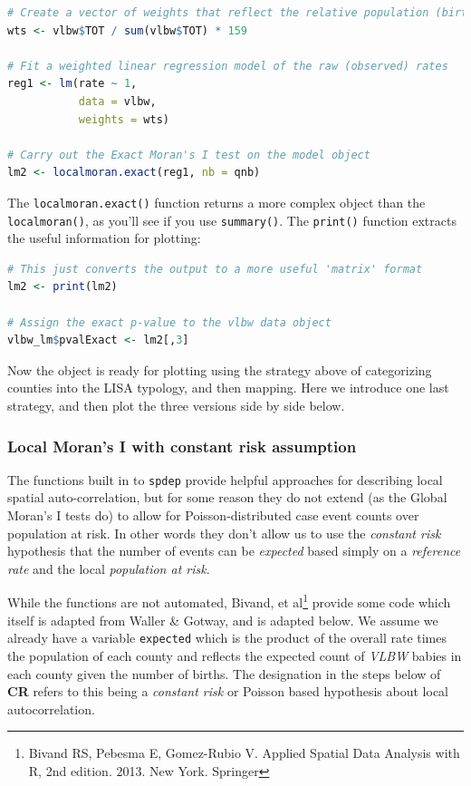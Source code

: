 \documentclass[
]{book}
\newcommand{\passthrough}[1]{#1}
\begin{document}
\begin{lstlisting}[language=R]
# Create a vector of weights that reflect the relative population (births) size in each county
wts <- vlbw$TOT / sum(vlbw$TOT) * 159

# Fit a weighted linear regression model of the raw (observed) rates
reg1 <- lm(rate ~ 1, 
           data = vlbw,
           weights = wts)

# Carry out the Exact Moran's I test on the model object
lm2 <- localmoran.exact(reg1, nb = qnb)
\end{lstlisting}

The \passthrough{\lstinline!localmoran.exact()!} function returns a more complex object than the \passthrough{\lstinline!localmoran()!}, as you'll see if you use \passthrough{\lstinline!summary()!}. The \passthrough{\lstinline!print()!} function extracts the useful information for plotting:

\begin{lstlisting}[language=R]
# This just converts the output to a more useful 'matrix' format
lm2 <- print(lm2)

# Assign the exact p-value to the vlbw data object
vlbw_lm$pvalExact <- lm2[,3]
\end{lstlisting}

Now the object is ready for plotting using the strategy above of categorizing counties into the LISA typology, and then mapping. Here we introduce one last strategy, and then plot the three versions side by side below.

\hypertarget{local-morans-i-with-constant-risk-assumption}{%
\subsubsection{Local Moran's I with constant risk assumption}\label{local-morans-i-with-constant-risk-assumption}}

The functions built in to \passthrough{\lstinline!spdep!} provide helpful approaches for describing local spatial auto-correlation, but for some reason they do not extend (as the Global Moran's I tests do) to allow for Poisson-distributed case event counts over population at risk. In other words they don't allow us to use the \emph{constant risk} hypothesis that the number of events can be \emph{expected} based simply on a \emph{reference rate} and the local \emph{population at risk}.

While the functions are not automated, Bivand, et al\footnote{Bivand RS, Pebesma E, Gomez-Rubio V. Applied Spatial Data Analysis with R, 2nd edition. 2013. New York. Springer} provide some code which itself is adapted from Waller \& Gotway, and is adapted below. We assume we already have a variable \passthrough{\lstinline!expected!} which is the product of the overall rate times the population of each county and reflects the expected count of \emph{VLBW} babies in each county given the number of births. The designation in the steps below of \textbf{CR} refers to this being a \emph{constant risk} or Poisson based hypothesis about local autocorrelation.
\end{document}
